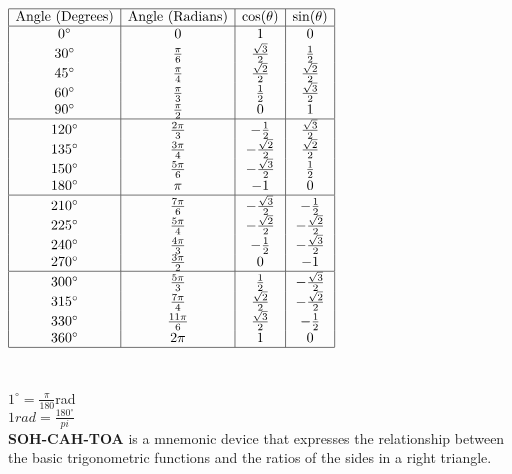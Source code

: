 \documentclass{article}
\begin{document}
\\
\\
\\
$
\begin{array}{|c|c|c|c|}
\hline
\text{Angle (Degrees)} & \text{Angle (Radians)} & \cos(\theta) & \sin(\theta) \\
\hline
0^\circ & 0 & 1 & 0 \\
30^\circ & \frac{\pi}{6} & \frac{\sqrt{3}}{2} & \frac{1}{2} \\
45^\circ & \frac{\pi}{4} & \frac{\sqrt{2}}{2} & \frac{\sqrt{2}}{2} \\
60^\circ & \frac{\pi}{3} & \frac{1}{2} & \frac{\sqrt{3}}{2} \\
90^\circ & \frac{\pi}{2} & 0 & 1 \\
\hline
120^\circ & \frac{2\pi}{3} & -\frac{1}{2} & \frac{\sqrt{3}}{2} \\
135^\circ & \frac{3\pi}{4} & -\frac{\sqrt{2}}{2} & \frac{\sqrt{2}}{2} \\
150^\circ & \frac{5\pi}{6} & -\frac{\sqrt{3}}{2} & \frac{1}{2} \\
180^\circ & \pi & -1 & 0 \\
\hline
210^\circ & \frac{7\pi}{6} & -\frac{\sqrt{3}}{2} & -\frac{1}{2} \\
225^\circ & \frac{5\pi}{4} & -\frac{\sqrt{2}}{2} & -\frac{\sqrt{2}}{2} \\
240^\circ & \frac{4\pi}{3} & -\frac{1}{2} & -\frac{\sqrt{3}}{2} \\
270^\circ & \frac{3\pi}{2} & 0 & -1 \\
\hline
300^\circ & \frac{5\pi}{3} & \frac{1}{2} & -\frac{\sqrt{3}}{2} \\
315^\circ & \frac{7\pi}{4} & \frac{\sqrt{2}}{2} & -\frac{\sqrt{2}}{2} \\
330^\circ & \frac{11\pi}{6} & \frac{\sqrt{3}}{2} & -\frac{1}{2} \\
360^\circ & 2\pi & 1 & 0 \\
\hline
\end{array}
$
\\
\\
\\

$1^\circ = \frac{\pi}{180}$rad\\

$1 rad = \frac{180^\circ}{pi}$\\

\textbf{SOH-CAH-TOA} is a mnemonic device that expresses the relationship between the basic trigonometric functions and the ratios of the sides in a right triangle.\\
\end{document}

